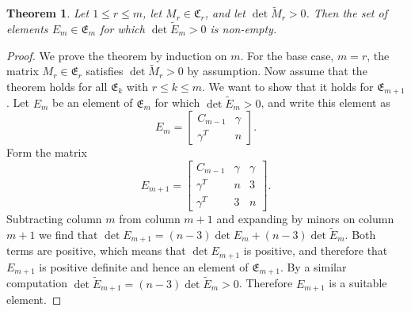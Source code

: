 \documentclass[11pt,a4paper]{article}
\newtheorem{theorem}{Theorem}
\begin{document}
\begin{theorem}
Let $1\le r\le m$, let $M_r\in\mathfrak{C}_r$, and let $\det\tilde M_r>0$. 
Then the set of elements $E_m\in\mathfrak{E}_m$ for which $\det\tilde E_m>0$
is non-empty.
\end{theorem}
\begin{proof}
We prove the theorem by induction on $m$.  For the base case, $m=r$, the
matrix $M_r\in\mathfrak{E}_r$ satisfies $\det\tilde{M}_r>0$ by assumption. 
Now assume that the theorem holds for all $\mathfrak{E}_k$ with $r\le k\le m$. 
We want to show that it holds for $\mathfrak{E}_{m+1}$.  Let $E_m$ be
an element of $\mathfrak{E}_m$ for which $\det\tilde E_m>0$, and write this
element as
\begin{equation}
E_m=\begin{bmatrix}C_{m-1} & \gamma\\\gamma^T & n\end{bmatrix}.
\end{equation}
Form the matrix
\begin{equation}
E_{m+1}=\begin{bmatrix}C_{m-1} & \gamma & \gamma\\\gamma^T & n & 3\\\gamma^T & 3 & n\end{bmatrix}.
\end{equation}
Subtracting column $m$ from column $m+1$ and expanding by minors on column
$m+1$ we find that $\det E_{m+1}=(n-3)\det E_m+(n-3)\det\tilde E_m$.  Both
terms are positive, which means that $\det E_{m+1}$ is positive, and
therefore that $E_{m+1}$ is positive definite and hence an element of
$\mathfrak{E}_{m+1}$.  By a similar computation $\det\tilde
E_{m+1}=(n-3)\det\tilde E_m>0$.  Therefore $E_{m+1}$ is a suitable element.
\end{proof}
\end{document}

